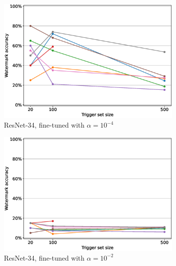 \begin{figure}
\begin{subfigure}{0.41\linewidth}
        \includegraphics[width=\linewidth]{images/finetuning/resnet34_finetuning_per_arch_00001.eps}
        \caption{ResNet-34, fine-tuned with $\alpha=10^{-4}$}
        \label{fig:finetuning-smalllr-allmethods-perarch-resnet34}
    \end{subfigure}
    \quad
    \begin{subfigure}{0.41\linewidth}
        \includegraphics[width=\linewidth]{images/finetuning/resnet34_finetuning_per_arch_001.eps}
        \caption{ResNet-34, fine-tuned with $\alpha=10^{-2}$}
        \label{fig:finetuning-largelr-allmethods-perarch-resnet34}
    \end{subfigure}
    \quad
    \begin{subfigure}{0.41\linewidth}

\end{subfigure}
\end{figure}
